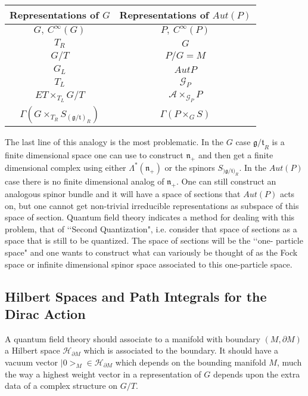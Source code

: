 \documentclass[a4paper,a4paper]{article}
\theoremstyle{conjecture}
\begin{document}
\begin{center}
\begin{tabular}{|c|c|}
\hline
Representations of $G$ & Representations of $Aut(P)$ \\
\hline
\hline
$G,\ C^\infty(G)$ & $P,\ C^\infty(P)$\\
\hline
$T_R$ & $G$\\
\hline
$G/T$ & $P/G=M$\\
\hline
$G_L$ & $Aut P$\\
\hline
$T_L$ & ${\mathcal G}_P$\\
\hline
$ET\times_{T_L} G/T$& $\mathcal A\times_{{\mathcal G}_P}P$\\
\hline
$\Gamma(G\times _{T_R} S_{({\mathfrak g /\mathfrak t})_R})$& $\Gamma(P\times_G S)$  \\ 
\hline
\end{tabular}
\end{center}

The last line of this analogy is the most problematic. In the $G$ case
${\mathfrak g /\mathfrak t}_R$ is a finite dimensional space one can
use to construct $\mathfrak n_+$ and then get a finite dimensional complex using either
$\Lambda^*(\mathfrak n_+)$ or the spinors $S_{){\mathfrak g /\mathfrak t})_R}$.
In the $Aut(P)$ case there is no finite dimensional analog of $\mathfrak n_+$.  One can
still construct an analogous spinor bundle and it will have a space of sections that 
$Aut(P)$ acts on, but one cannot get non-trivial irreducible representations as subspace
of this space of section.  Quantum field theory indicates a method for dealing with
this problem, that of \lq\lq Second Quantization", i.e. consider that space of sections
as a space that is still to be quantized.  The space of sections will be the \lq\lq one-
particle space" and one wants to construct what can variously be thought of as the Fock
space or infinite dimensional spinor space associated to this one-particle space. 


\subsection{Hilbert Spaces and Path Integrals for the Dirac Action}

A quantum field theory should associate to a manifold with boundary $(M,\partial M)$ a
Hilbert space ${\mathcal H}_{\partial M}$ which is associated to the boundary. It should
have a vacuum vector $|0>_M\in {\mathcal H}_{\partial M}$ which depends on the bounding
manifold $M$, much the way a highest weight vector in a representation of $G$ depends upon
the extra data of a complex structure on $G/T$.
\end{document}
